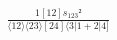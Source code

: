\documentclass[varwidth, border=5pt]{standalone}
\begin{document}
\begin{my}
$\begin{gathered}
\scriptscriptstyle\frac{1[12]s_{123}²}{⟨12⟩⟨23⟩[24]⟨3|1+2|4]}
\end{gathered}$
\end{my}
\end{document}
